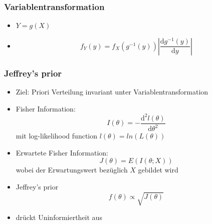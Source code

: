 \documentclass[aspectratio=169,xcolor=dvipsnames]{beamer}
\begin{document}


\begin{frame}
\frametitle{Variablentransformation}
\begin{itemize}
\item $Y=g(X)$
\item $$f_Y(y)=f_X(g^{-1}(y))\left|\frac{\text{d}g^{-1}(y)}{\text{d}y}\right|$$
\end{itemize}
\end{frame}

\begin{frame}
\frametitle{Jeffrey's prior}
\begin{itemize}
\item<1-> Ziel: Priori Verteilung invariant unter Variablentransformation
\item<2-> Fisher Information: $$I(\theta)=-\frac{\text{d}^2l(\theta)}{\text{d}\theta^2}$$
mit log-likelihood function $l(\theta)=ln(L(\theta))$
\item<3-> Erwartete Fisher Information: $$J(\theta)=E(I(\theta;X))$$
wobei der Erwartungswert bezüglich $X$ gebildet wird
\item<4-> Jeffrey's prior $$f(\theta)\propto\sqrt{J(\theta)}$$
\item<5-> drückt Uninformiertheit aus
\end{itemize}
\end{frame}
\end{document}
